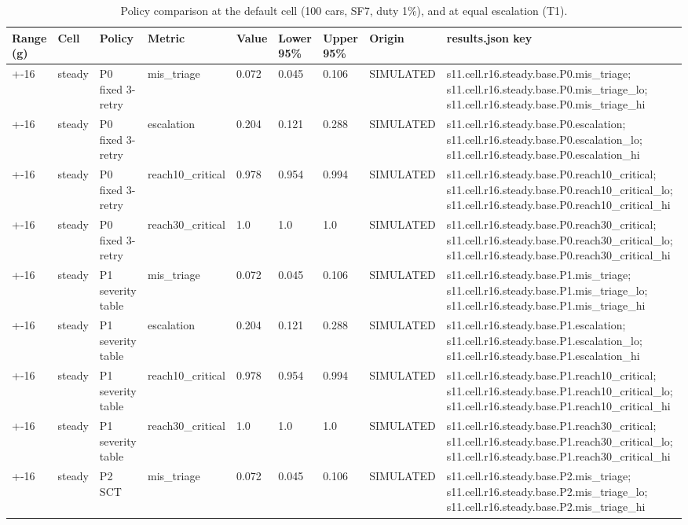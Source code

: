 \begin{table}[t]
\centering
\small
\caption{Policy comparison at the default cell (100 cars, SF7, duty 1\%), and at equal escalation (T1).}
\label{tab:tab_policy_comparison}
\begin{tabular}{lllllllll}
\toprule
Range (g) & Cell & Policy & Metric & Value & Lower 95\% & Upper 95\% & Origin & results.json key \\
\midrule
+-16 & steady & P0 fixed 3-retry & mis\_triage & 0.072 & 0.045 & 0.106 & SIMULATED & s11.cell.r16.steady.base.P0.mis\_triage; s11.cell.r16.steady.base.P0.mis\_triage\_lo; s11.cell.r16.steady.base.P0.mis\_triage\_hi \\
+-16 & steady & P0 fixed 3-retry & escalation & 0.204 & 0.121 & 0.288 & SIMULATED & s11.cell.r16.steady.base.P0.escalation; s11.cell.r16.steady.base.P0.escalation\_lo; s11.cell.r16.steady.base.P0.escalation\_hi \\
+-16 & steady & P0 fixed 3-retry & reach10\_critical & 0.978 & 0.954 & 0.994 & SIMULATED & s11.cell.r16.steady.base.P0.reach10\_critical; s11.cell.r16.steady.base.P0.reach10\_critical\_lo; s11.cell.r16.steady.base.P0.reach10\_critical\_hi \\
+-16 & steady & P0 fixed 3-retry & reach30\_critical & 1.0 & 1.0 & 1.0 & SIMULATED & s11.cell.r16.steady.base.P0.reach30\_critical; s11.cell.r16.steady.base.P0.reach30\_critical\_lo; s11.cell.r16.steady.base.P0.reach30\_critical\_hi \\
+-16 & steady & P1 severity table & mis\_triage & 0.072 & 0.045 & 0.106 & SIMULATED & s11.cell.r16.steady.base.P1.mis\_triage; s11.cell.r16.steady.base.P1.mis\_triage\_lo; s11.cell.r16.steady.base.P1.mis\_triage\_hi \\
+-16 & steady & P1 severity table & escalation & 0.204 & 0.121 & 0.288 & SIMULATED & s11.cell.r16.steady.base.P1.escalation; s11.cell.r16.steady.base.P1.escalation\_lo; s11.cell.r16.steady.base.P1.escalation\_hi \\
+-16 & steady & P1 severity table & reach10\_critical & 0.978 & 0.954 & 0.994 & SIMULATED & s11.cell.r16.steady.base.P1.reach10\_critical; s11.cell.r16.steady.base.P1.reach10\_critical\_lo; s11.cell.r16.steady.base.P1.reach10\_critical\_hi \\
+-16 & steady & P1 severity table & reach30\_critical & 1.0 & 1.0 & 1.0 & SIMULATED & s11.cell.r16.steady.base.P1.reach30\_critical; s11.cell.r16.steady.base.P1.reach30\_critical\_lo; s11.cell.r16.steady.base.P1.reach30\_critical\_hi \\
+-16 & steady & P2 SCT & mis\_triage & 0.072 & 0.045 & 0.106 & SIMULATED & s11.cell.r16.steady.base.P2.mis\_triage; s11.cell.r16.steady.base.P2.mis\_triage\_lo; s11.cell.r16.steady.base.P2.mis\_triage\_hi \\

\end{tabular}
\end{table}
